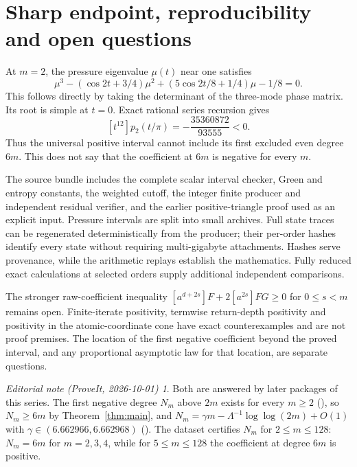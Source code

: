 \documentclass[11pt,a4paper]{article}
\theoremstyle{remark}\newtheorem*{ednote}{Editorial note (ProveIt, 2026-10-01)}
\begin{document}
\section{Sharp endpoint, reproducibility and open questions}
At $m=2$, the pressure eigenvalue $\mu(t)$ near one satisfies
\[
 \mu^3-(\cos2t+3/4)\mu^2+(5\cos2t/8+1/4)\mu-1/8=0.
\]
This follows directly by taking the determinant of the three-mode phase matrix. Its root is simple at $t=0$. Exact rational series recursion gives
\[
 [t^{12}]p_2(t/\pi)=-\frac{35360872}{93555}<0.
\]
Thus the universal positive interval cannot include its first excluded even degree $6m$. This does not say that the coefficient at $6m$ is negative for every $m$.

The source bundle includes the complete scalar interval checker, Green and entropy constants, the weighted cutoff, the integer finite producer and independent residual verifier, and the earlier positive-triangle proof used as an explicit input. Pressure intervals are split into small archives. Full state traces can be regenerated deterministically from the producer; their per-order hashes identify every state without requiring multi-gigabyte attachments. Hashes serve provenance, while the arithmetic replays establish the mathematics. Fully reduced exact calculations at selected orders supply additional independent comparisons.

The stronger raw-coefficient inequality $[a^{d+2s}]F+2[a^{2s}]FG\ge0$ for $0\le s<m$ remains open. Finite-iterate positivity, termwise return-depth positivity and positivity in the atomic-coordinate cone have exact counterexamples and are not proof premises. The location of the first negative coefficient beyond the proved interval, and any proportional asymptotic law for that location, are separate questions.
\begin{ednote}
Both are answered by later packages of this series. The first negative degree $N_m$ above $2m$
exists for every $m\ge2$ (), so $N_m\ge6m$ by
Theorem~\ref{thm:main}, and $N_m=\gamma m-\Lambda^{-1}\log\log(2m)+O(1)$ with $\gamma\in(6.662966,6.662968)$ (). The dataset
 certifies $N_m$ for $2\le m\le128$: $N_m=6m$ for $m=2,3,4$,
while for $5\le m\le128$ the coefficient at degree $6m$ is positive.
\end{ednote}
\end{document}
